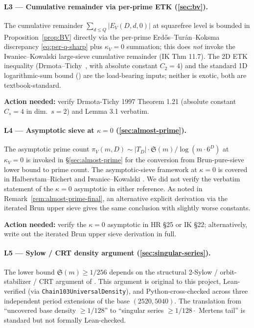 \documentclass[11pt,a4paper]{article}
\theoremstyle{plain}
\theoremstyle{definition}
\theoremstyle{remark}
\begin{document}
\paragraph{L3 --- Cumulative remainder via per-prime ETK
(\cref{sec:bv}).}
The cumulative remainder $\sum_{d \leq Q} |E_{V}(D, d, 0)|$ at
squarefree level is bounded in Proposition~\ref{prop:BV} directly via
the per-prime Erd\H{o}s--Tur\'an--Koksma discrepancy
\eqref{eq:per-q-sharp} plus $\kappa_{V} = 0$ summation; this does
\emph{not} invoke the Iwaniec--Kowalski large-sieve cumulative
remainder (IK Thm 11.7). The 2D ETK inequality
(Drmota--Tichy~\cite[Thm.~1.21]{DrmotaTichy1997}, with absolute
constant $C_{2} = 4$) and the standard 1D logarithmic-sum bound
(\cite[Lemma~3.1]{DrmotaTichy1997}) are the load-bearing inputs;
neither is exotic, both are textbook-standard.

\textbf{Action needed:} verify Drmota-Tichy 1997 Theorem 1.21
(absolute constant $C_{s} = 4$ in dim.\ $s = 2$) and Lemma 3.1
verbatim.

\paragraph{L4 --- Asymptotic sieve at $\kappa = 0$
(\cref{sec:almost-prime}).}
The asymptotic prime count $\pi_{V}(m, D) \sim |T_{D}| \cdot
\mathfrak{S}(m) / \log(m \cdot 6^{D})$ at $\kappa_{V} = 0$ is invoked
in \S\ref{sec:almost-prime} for the conversion from Brun-pure-sieve
lower bound to prime count. The asymptotic-sieve framework at
$\kappa = 0$ is covered in
Halberstam--Richert \cite[\S25]{HalberstamRichert1974} and
Iwaniec--Kowalski \cite[\S22]{IwaniecKowalski2004}. We did not verify
the verbatim statement of the $\kappa = 0$ asymptotic in either
reference. As noted in Remark~\ref{rem:almost-prime-final}, an
alternative explicit derivation via the iterated Brun upper sieve
gives the same conclusion with slightly worse constants.

\textbf{Action needed:} verify the $\kappa = 0$ asymptotic in
HR \S25 or IK \S22; alternatively, write out the iterated Brun upper
sieve derivation in full.

\paragraph{L5 --- Sylow / CRT density argument
(\cref{sec:singular-series}).}
The lower bound $\mathfrak{S}(m) \geq 1/256$ depends on the
structural 2-Sylow / orbit-stabilizer / CRT argument of
\cite{WilderChain103}. This argument is original to this project,
Lean-verified (via \texttt{Chain103UniversalDensity}), and
Python-cross-checked across three independent period extensions of
the base $(2520, 5040)$. The translation from ``uncovered base
density $\geq 1/128$'' to ``singular series $\geq 1/128 \cdot$
Mertens tail'' is standard but not formally Lean-checked.
\end{document}
